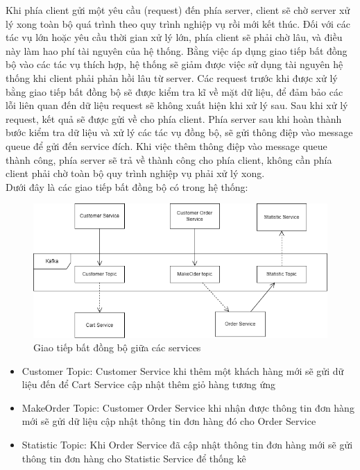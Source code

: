 Khi phía client gửi một yêu cầu (request) đến phía server, client sẽ chờ server xử lý xong toàn bộ quá trình theo quy trình nghiệp vụ rồi mới kết thúc. Đối với các tác vụ lớn hoặc yêu cầu thời gian xử lý lớn, phía client sẽ phải chờ lâu, và điều này làm hao phí tài nguyên của hệ thống. Bằng việc áp dụng giao tiếp bất đồng bộ vào các tác vụ thích hợp, hệ thống sẽ giảm được việc sử dụng tài nguyên hệ thống khi client phải phản hồi lâu từ server. Các request trước khi được xử lý bằng giao tiếp bất đồng bộ sẽ được kiểm tra kĩ về mặt dữ liệu, để đảm bảo các lỗi liên quan đến dữ liệu request sẽ không xuất hiện khi xử lý sau. Sau khi xử lý request, kết quả sẽ được gửi về cho phía client. Phía server sau khi hoàn thành bước kiểm tra dữ liệu và xử lý các tác vụ đồng bộ, sẽ gửi thông điệp vào message queue để gửi đến service đích. Khi việc thêm thông điệp vào message queue thành công, phía server sẽ trả về thành công cho phía client, không cần phía client phải chờ toàn bộ quy trình nghiệp vụ phải xử lý xong.\\
 
Dưới đây là các giao tiếp bất đồng bộ có trong hệ thống:
 
\begin{figure}[!htp]
    \centering
    \includegraphics[width=13cm]{img/Architecture/kafka.png}
    \newline
    \caption{Giao tiếp bất đồng bộ giữa các services}
\end{figure}
 
\begin{itemize}
    \item Customer Topic: Customer Service khi thêm một khách hàng mới sẽ gửi dữ liệu đến để Cart Service cập nhật thêm giỏ hàng tương ứng
    \item MakeOrder Topic: Customer Order Service khi nhận được thông tin đơn hàng mới sẽ gửi dữ liệu cập nhật thông tin đơn hàng đó cho Order Service
    \item Statistic Topic: Khi Order Service đã cập nhật thông tin đơn hàng mới sẽ gửi thông tin đơn hàng cho Statistic Service để thống kê
\end{itemize}